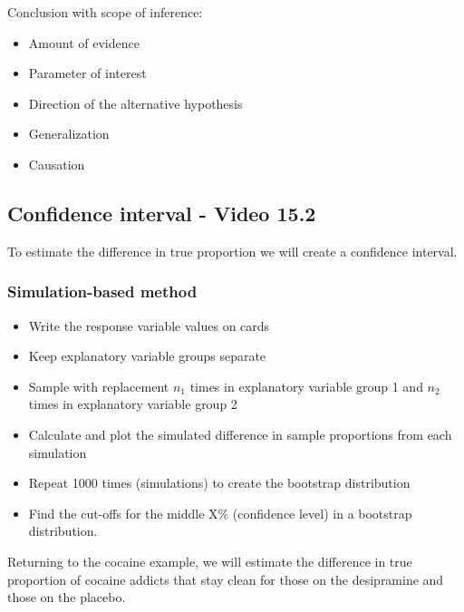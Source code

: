 \documentclass[
]{report}
\begin{document}
\vspace{0.8in}

Conclusion with scope of inference:

\begin{itemize}
\item
  Amount of evidence
\item
  Parameter of interest
\item
  Direction of the alternative hypothesis
\item
  Generalization
\item
  Causation
\end{itemize}

\vspace{0.8in}

\newpage

\subsection*{Confidence interval - Video 15.2}\label{confidence-interval---video-15.2}

To estimate the difference in true proportion we will create a confidence interval.

\subsubsection*{Simulation-based method}\label{simulation-based-method-5}

\begin{itemize}
\item
  Write the response variable values on cards
\item
  Keep explanatory variable groups separate
\item
  Sample with replacement \(n_1\) times in explanatory variable group 1 and \(n_2\) times in explanatory variable group 2
\item
  Calculate and plot the simulated difference in sample proportions from each simulation
\item
  Repeat 1000 times (simulations) to create the bootstrap distribution
\item
  Find the cut-offs for the middle X\% (confidence level) in a bootstrap distribution.
\end{itemize}

Returning to the cocaine example, we will estimate the difference in true proportion of cocaine addicts that stay clean for those on the desipramine and those on the placebo.
\end{document}
